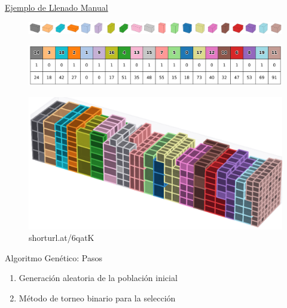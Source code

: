 \documentclass[handout]{beamer}
\begin{document}
\begin{frame}{\href{https://raw.githubusercontent.com/josegustavo/clp/main/clp/presentation/pic/clp.gif}{Ejemplo de Llenado Manual}}
    \begin{figure}
        \centering
        \includegraphics[width=.8\textwidth]{pic/cubos.png}
    \end{figure}
    \begin{figure}
        \centering
        \includegraphics[width=.8\textwidth]{pic/tabla_colores_3x20.png}
    \end{figure}
    \begin{figure}
        \centering
        \includegraphics[width=.8\textwidth]{pic/contenedor-lleno.png}
        \caption*{shorturl.at/6qatK}
    \end{figure}
\end{frame}

\begin{frame}{Algoritmo Genético: Pasos}
    \begin{enumerate}[<+-| alert@+>]
        \item Generación aleatoria de la población inicial
        \item Método de torneo binario para la selección
    \end{enumerate}
\end{frame}
\end{document}
